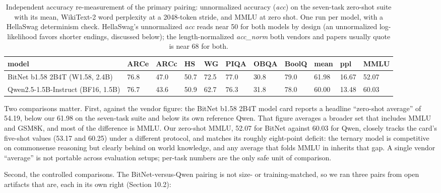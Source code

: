 \documentclass[11pt]{article}
\begin{document}
\begin{table}[htbp]\centering
\caption{Independent accuracy re-measurement of the primary pairing: unnormalized accuracy (\emph{acc}) on the seven-task zero-shot suite with its mean, WikiText-2 word perplexity at a 2048-token stride, and MMLU at zero shot. One run per model, with a HellaSwag determinism check. HellaSwag's unnormalized \emph{acc} reads near 50 for both models by design (an unnormalized log-likelihood favors shorter endings, discussed below); the length-normalized \emph{acc\_norm} both vendors and papers usually quote is near 68 for both.}
\label{tab:acc-primary}
\footnotesize
\begin{tabularx}{\linewidth}{Lllllllllll}\toprule
model & ARCe & ARCc & HS & WG & PIQA & OBQA & BoolQ & mean & ppl & MMLU \\
\midrule
BitNet b1.58 2B4T (W1.58, 2.4B) & 76.8 & 47.0 & 50.7 & 72.5 & 77.0 & 30.8 & 79.0 & 61.98 & 16.67 & 52.07 \\
Qwen2.5-1.5B-Instruct (BF16, 1.5B) & 76.7 & 43.6 & 50.9 & 62.7 & 76.3 & 31.8 & 78.0 & 60.00 & 13.48 & 60.03 \\
\bottomrule\end{tabularx}\end{table}

Two comparisons matter. First, against the vendor figure: the BitNet b1.58 2B4T model
card reports a headline ``zero-shot average'' of 54.19, below our 61.98 on the seven-task
suite and below its own reference Qwen. That figure averages a broader set that includes
MMLU and GSM8K, and most of the difference is MMLU. Our zero-shot MMLU, 52.07 for BitNet
against 60.03 for Qwen, closely tracks the card's five-shot values (53.17 and 60.25) under a
different protocol, and matches its
roughly eight-point deficit: the ternary model is competitive on commonsense reasoning
but clearly behind on world knowledge, and any average that folds MMLU in inherits that
gap. A single vendor ``average'' is not portable across evaluation setups; per-task numbers
are the only safe unit of comparison.

Second, the controlled comparisons. The BitNet-versus-Qwen pairing is not size- or
training-matched, so we ran three pairs from open artifacts that are, each in its own
right (Section 10.2):
\end{document}
